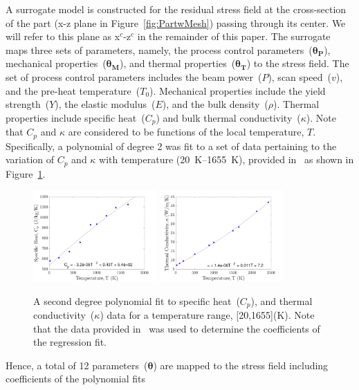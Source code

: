A surrogate model is constructed for the residual stress field at the cross-section of the part 
(x-z plane in Figure~\ref{fig:PartwMesh}) passing through its center. We will refer to this plane
as x$^c$-z$^c$ in the remainder of this paper. The surrogate maps three sets of
parameters, namely, the process control parameters~($\bm{\theta_P}$), mechanical properties~($\bm{\theta_M}$),
and thermal properties~($\bm{\theta_T}$) to the stress field. The set of process control parameters includes
the beam power~($P$), scan speed~($v$), and the pre-heat temperature~($T_0$). Mechanical properties
include the yield strength~($Y$), the elastic modulus~($E$), and the bulk density~($\rho$). Thermal 
properties include specific heat~($C_p$) and bulk thermal conductivity~($\kappa$). Note that $C_p$ and $\kappa$
are considered to be functions of the local temperature, $T$. Specifically, a polynomial of degree 2 was fit
to a set of data pertaining to the variation of $C_p$ and $\kappa$ with temperature (20~K--1655~K), 
provided in~\cite{Fu:2014} as shown in Figure~\ref{fig:Cp_kappa}.
%
\begin{figure}[htbp]
\begin{center}
\includegraphics[width=0.42\textwidth]{./Figures/cp_fit}
\includegraphics[width=0.42\textwidth]{./Figures/kappa_fit}
\end{center}
\caption{A second degree polynomial fit to specific heat~($C_p$), and thermal conductivity~($\kappa$) data
for a temperature range, [20,1655](K). Note that the data provided in~\cite{Fu:2014} was used to determine
the coefficients of the regression fit.}
\label{fig:Cp_kappa}
\end{figure}
%
Hence, a total of 12 parameters~($\bm{\theta}$) are mapped to the stress field including coefficients of the polynomial fits
